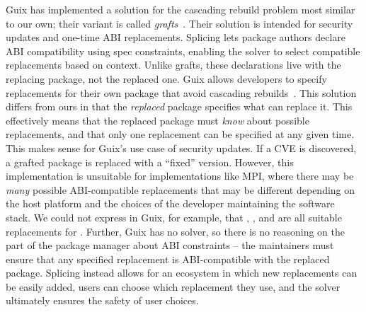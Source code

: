 Guix has implemented a solution for the cascading rebuild problem most similar to our
own; their variant is called {\it grafts}~\cite{guix-manual-grafts}. Their solution is
intended for security updates and one-time ABI replacements.
%
Splicing lets package authors declare ABI compatibility using spec constraints, enabling
the solver to select compatible replacements based on context. Unlike grafts, these
declarations live with the replacing package, not the replaced one.
Guix allows developers to specify replacements for their own package that avoid cascading
rebuilds~\cite{courtes2016timely,courtes2020grafts}. This
solution differs from ours in that the {\it replaced} package specifies what can replace
it. This effectively means that the replaced package must {\it know} about possible
replacements, and that only one replacement can be specified at any given time. This
makes sense for Guix's use case of security updates. If a CVE is discovered, a grafted
package is replaced with a ``fixed'' version. However, this implementation is unsuitable
for implementations like MPI, where there may be {\it many} possible ABI-compatible
replacements that may be different depending on the host platform and the choices of the
developer maintaining the software stack. We could not express in Guix, for example,
that , , and  are all suitable
replacements for . Further, Guix has no solver, so there is no reasoning
on the part of the package manager about ABI constraints -- the maintainers must ensure
that any specified replacement is ABI-compatible with the replaced package.
Splicing instead allows for
an ecosystem in which new replacements can be easily added, users can choose which
replacement they use, and the solver ultimately ensures the safety of user choices.
